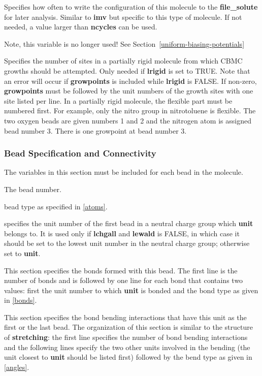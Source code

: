 \documentclass[12pt,letterpaper]{article}
\begin{document}
 Specifies how often to write the
configuration of this molecule to the {\bf file\_solute} for
later analysis. Similar to {\bf imv} but specific to this
type of molecule. If not needed, a value larger than {\bf
  ncycles} can be used.

 Note, this variable is no longer used!
See Section~\ref{uniform-biasing-potentials}

 Specifies the number of sites in
a partially rigid molecule from which CBMC growths should be
attempted. Only needed if {\bf lrigid} is set to TRUE. Note
that an error will occur if {\bf growpoints} is included
while {\bf lrigid} is FALSE. If non-zero, {\bf growpoints}
must be followed by the unit numbers of the growth sites
with one site listed per line. In a partially rigid
molecule, the flexible part must be numbered first. For
example, only the nitro group in nitrotoluene is flexible.
The two oxygen beads are given numbers 1 and 2 and the
nitrogen atom is assigned bead number 3. There is one
growpoint at bead number 3.

\subsubsection{Bead Specification and Connectivity}
\label{beadspec}
The variables in this section must be included for each bead
in the molecule.

 The bead number.

 bead type as specified in \ref{atoms}.

 specifies the unit number of the
first bead in a neutral charge group which {\bf unit}
belongs to. It is used only if {\bf lchgall} and {\bf
  lewald} is FALSE, in which case it should be set to the
lowest unit number in the neutral charge group; otherwise
set to {\bf unit}.

 This section specifies the bonds
formed with this bead. The first line is the number of bonds
and is followed by one line for each bond that contains two
values: first the unit number to which {\bf unit} is bonded
and the bond type as given in \ref{bonds}.

 This section specifies the bond
bending interactions that have this unit as the first or the
last bead. The organization of this section is similar to
the structure of {\bf stretching}: the first line specifies
the number of bond bending interactions and the following
lines specify the two other units involved in the bending
(the unit closest to {\bf unit} should be listed first)
followed by the bend type as given in \ref{angles}.
\end{document}
